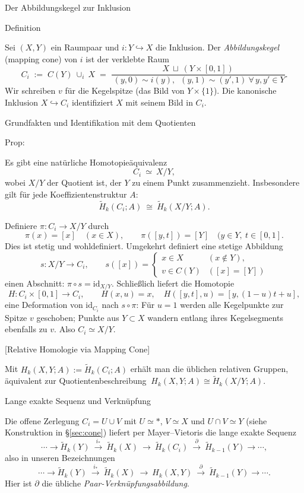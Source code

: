 \documentclass[10pt, letterpaper]{article}
\begin{document}
Der Abbildungskegel zur Inklusion

Definition

Sei $(X,Y)$ ein Raumpaar und $i:Y\hookrightarrow X$ die Inklusion. Der \emph{Abbildungskegel} (mapping cone) von $i$ ist der verklebte Raum
\[
  C_i \;:=\; C(Y)\ \cup_i\ X
  \;=\;
  \frac{X\ \sqcup\ (Y\times[0,1])}{\ (y,0)\sim i(y),\;\ (y,1)\sim(y',1)\ \forall\,y,y'\in Y }.
\]
Wir schreiben $v$ für die Kegelspitze (das Bild von $Y\times\{1\}$). Die kanonische Inklusion $X\hookrightarrow C_i$ identifiziert $X$ mit seinem Bild in $C_i$.

Grundfakten und Identifikation mit dem Quotienten

Prop: 

Es gibt eine natürliche Homotopieäquivalenz
\[
  C_i \ \simeq\ X/Y,
\]
wobei $X/Y$ der Quotient ist, der $Y$ zu einem Punkt zusammenzieht. Insbesondere gilt für jede Koeffizientenstruktur $A$:
\[
  \widetilde H_k(C_i;A)\ \cong\ \widetilde H_k(X/Y;A).
\]

Definiere $\pi:C_i\to X/Y$ durch
\[
  \pi(x)=[x]\quad (x\in X),\qquad \pi([y,t])=[Y]\quad (y\in Y,\ t\in[0,1].
\]
Dies ist stetig und wohldefiniert. Umgekehrt definiert eine stetige Abbildung
\[
  s:X/Y\to C_i,\qquad s([x])=
  \begin{cases}
    x\in X & (x\notin Y),\\
    v\in C(Y) & ([x]=[Y])
  \end{cases}
\]
einen Abschnitt: $\pi\circ s=\mathrm{id}_{X/Y}$. Schließlich liefert die Homotopie
\[
  H:C_i\times[0,1]\to C_i,\qquad
  H(x,u)=x,\quad H([y,t],u)=[y,(1-u)t+u],
\]
eine Deformation von $\mathrm{id}_{C_i}$ nach $s\circ \pi$: Für $u=1$ werden alle Kegelpunkte zur Spitze $v$ geschoben; Punkte aus $Y\subset X$ wandern entlang ihres Kegelsegments ebenfalls zu $v$. Also $C_i\simeq X/Y$.


[Relative Homologie via Mapping Cone]

Mit $H_k(X,Y;A):=\widetilde H_k(C_i;A)$ erhält man die üblichen relativen Gruppen, äquivalent zur Quotientenbeschreibung
\(\ H_k(X,Y;A)\cong \widetilde H_k(X/Y;A).\)


Lange exakte Sequenz und Verknüpfung

Die offene Zerlegung $C_i=U\cup V$ mit $U\simeq *$, $V\simeq X$ und $U\cap V\simeq Y$ (siehe Konstruktion in \S\ref{sec:cone}) liefert per Mayer–Vietoris die lange exakte Sequenz
\[
\cdots\to \widetilde H_k(Y)\ \xrightarrow{i_*}\ \widetilde H_k(X)\ \to\ \widetilde H_k(C_i)\ \xrightarrow{\ \partial\ }\ \widetilde H_{k-1}(Y)\to\cdots,
\]
also in unseren Bezeichnungen
\[
\cdots\to \widetilde H_k(Y)\ \xrightarrow{i_*}\ \widetilde H_k(X)\ \to\ H_k(X,Y)\ \xrightarrow{\ \partial\ }\ \widetilde H_{k-1}(Y)\to\cdots.
\]
Hier ist $\partial$ die übliche \emph{Paar-Verknüpfungsabbildung}.
\end{document}
